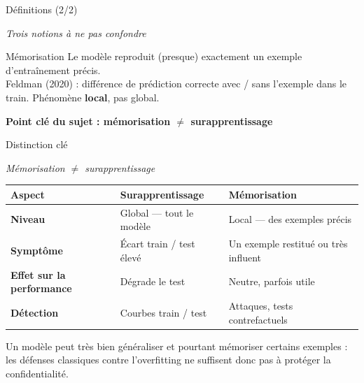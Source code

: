 \documentclass[aspectratio=169, 10pt, table]{beamer}
\newcommand{\subtitleline}[1]{{\small\itshape\color{TSPcyan}#1\par}\vspace{0.2cm}}
\begin{document}
\begin{frame}{Définitions (2/2)}
    \subtitleline{Trois notions à ne pas confondre}
    
    \begin{exampleblock}{Mémorisation}
        Le modèle reproduit (presque) exactement un exemple d'entraînement précis.\\
        Feldman (2020) : différence de prédiction correcte avec / sans l'exemple dans le train. Phénomène \textbf{local}, pas global.
    \end{exampleblock}
    
    \vspace{0.4cm}
    \textbf{Point clé du sujet : mémorisation $\neq$ surapprentissage}
\end{frame}

\begin{frame}{Distinction clé}
    \subtitleline{Mémorisation $\neq$ surapprentissage}
    
    \begin{table}
        \renewcommand{\arraystretch}{1.4}
        \small
        \begin{tabularx}{\textwidth}{>{\bfseries}l >{\raggedright\arraybackslash}X >{\raggedright\arraybackslash}X}
            \toprule
            \rowcolor{TSPdark}\color{white}\textbf{\footnotesize Aspect} & \color{white}\textbf{\footnotesize Surapprentissage} & \color{white}\textbf{\footnotesize Mémorisation} \\
            \midrule
            Niveau & Global — tout le modèle & Local — des exemples précis \\
            Symptôme & Écart train / test élevé & Un exemple restitué ou très influent \\
            Effet sur la performance & Dégrade le test & Neutre, parfois utile \\
            Détection & Courbes train / test & Attaques, tests contrefactuels \\
            \bottomrule
        \end{tabularx}
    \end{table}
    
    \vspace{0.1cm}
    {\footnotesize Un modèle peut très bien généraliser et pourtant mémoriser certains exemples : les défenses classiques contre l'overfitting ne suffisent donc pas à protéger la confidentialité.\par}
\end{frame}
\end{document}
